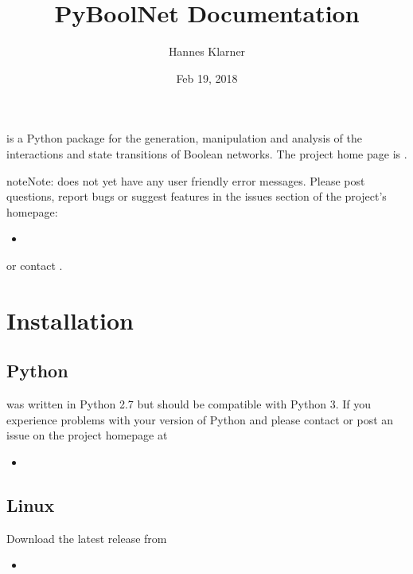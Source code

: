 \documentclass[letterpaper,10pt,english]{sphinxmanual}
\title{PyBoolNet Documentation}
\date{Feb 19, 2018}
\author{Hannes Klarner}
\begin{document}
\maketitle
\sphinxtableofcontents
{}\label{\detokenize{index::doc}}
 is a Python package for the generation, manipulation and analysis of the interactions and state transitions of Boolean networks.
The project home page is .

\begin{sphinxadmonition}{note}{Note:}
 does not yet have any user friendly error messages.
Please post questions, report bugs or suggest features in the issues section of the project’s homepage:
\begin{itemize}
\item {} 

\end{itemize}

or contact .
\end{sphinxadmonition}




\chapter{Installation}
\label{\detokenize{Installation:installation}}\label{\detokenize{Installation:id1}}\label{\detokenize{Installation::doc}}\label{\detokenize{Installation:installation-software}}

\section{Python}
\label{\detokenize{Installation:python}}
 was written in Python 2.7 but should be compatible with Python 3.
If you experience problems with your version of Python and  please contact  or
post an issue on the project homepage at
\begin{itemize}
\item {} 

\end{itemize}


\section{Linux}
\label{\detokenize{Installation:linux}}
Download the latest release from
\begin{itemize}
\item {} 

\end{itemize}
\end{document}
